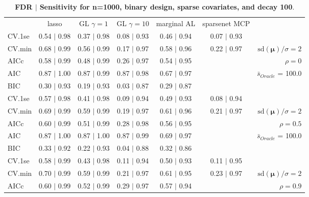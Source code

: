 \clearpage
\begin{table}\vspace{-.5cm}
\caption[l]{ {\it }
{ \bf FDR $\boldsymbol{\mid}$ Sensitivity for n=1000, binary design, sparse covariates, and  decay  100}.}
\vspace{-.5cm}
\footnotesize{}
\begin{center}
\begin{tabular}{l*{5}{c}|r}
 & lasso & GL $\gamma=1$ & GL $\gamma=10$ & marginal AL & sparsenet MCP  & \\
 \cline{1-7}
CV.1se & 0.54 $\mid$ 0.98 & 0.37 $\mid$ 0.98 & 0.08 $\mid$ 0.93 & 0.46 $\mid$ 0.94 & 0.07 $\mid$ 0.93 & \\
CV.min & 0.68 $\mid$ 0.99 & 0.56 $\mid$ 0.99 & 0.17 $\mid$ 0.97 & 0.58 $\mid$ 0.96 & 0.22 $\mid$ 0.97 &  $\mathrm{sd}(\mathbf{\mu})/\sigma=2$ \\
AICc & 0.58 $\mid$ 0.99 & 0.48 $\mid$ 0.99 & 0.26 $\mid$ 0.97 & 0.54 $\mid$ 0.95 & & $\rho=0$ \\
AIC & 0.87 $\mid$ 1.00 & 0.87 $\mid$ 0.99 & 0.87 $\mid$ 0.98 & 0.67 $\mid$ 0.97 & &  \multirow{2}{*}{$\bar{s}_{Oracle}$ = 100.0} \\
BIC & 0.30 $\mid$ 0.93 & 0.19 $\mid$ 0.93 & 0.03 $\mid$ 0.87 & 0.29 $\mid$ 0.87 & &  \\
 \hline 
CV.1se & 0.57 $\mid$ 0.98 & 0.41 $\mid$ 0.98 & 0.09 $\mid$ 0.94 & 0.49 $\mid$ 0.93 & 0.08 $\mid$ 0.94 & \\
CV.min & 0.69 $\mid$ 0.99 & 0.59 $\mid$ 0.99 & 0.19 $\mid$ 0.97 & 0.61 $\mid$ 0.96 & 0.21 $\mid$ 0.97 &  $\mathrm{sd}(\mathbf{\mu})/\sigma=2$ \\
AICc & 0.60 $\mid$ 0.99 & 0.51 $\mid$ 0.99 & 0.28 $\mid$ 0.98 & 0.56 $\mid$ 0.95 & & $\rho=0.5$ \\
AIC & 0.87 $\mid$ 1.00 & 0.87 $\mid$ 1.00 & 0.87 $\mid$ 0.99 & 0.69 $\mid$ 0.97 & &  \multirow{2}{*}{$\bar{s}_{Oracle}$ = 100.0} \\
BIC & 0.33 $\mid$ 0.92 & 0.22 $\mid$ 0.93 & 0.04 $\mid$ 0.88 & 0.32 $\mid$ 0.86 & &  \\
 \hline 
CV.1se & 0.58 $\mid$ 0.99 & 0.43 $\mid$ 0.98 & 0.11 $\mid$ 0.94 & 0.50 $\mid$ 0.93 & 0.11 $\mid$ 0.95 & \\
CV.min & 0.70 $\mid$ 0.99 & 0.59 $\mid$ 0.99 & 0.21 $\mid$ 0.97 & 0.61 $\mid$ 0.95 & 0.23 $\mid$ 0.97 &  $\mathrm{sd}(\mathbf{\mu})/\sigma=2$ \\
AICc & 0.60 $\mid$ 0.99 & 0.52 $\mid$ 0.99 & 0.29 $\mid$ 0.97 & 0.57 $\mid$ 0.94 & & $\rho=0.9$ \\

\end{tabular}
\end{center}
\end{table}
